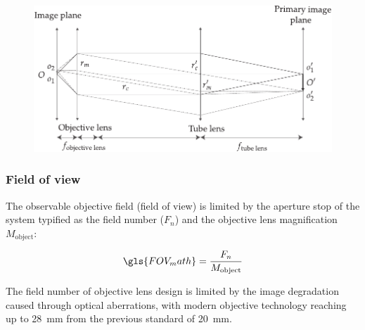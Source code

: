 \begin{figure}
    \centering
    \includegraphics{./magnification}
    \caption{}
    \label{fig:magnification}
\end{figure}






\subsubsection{Field of view}


The observable objective field (field of view) is limited by the aperture stop of the system typified as the field number ($F_n $) and the \gls{objective lens} magnification $M_{\text{object}}$:

\begin{align}
\gls{FOV_math} = \frac{F_{n}}{M_{\text{object}}}
\end{align}

The field number of \gls{objective lens} design is limited by the image degradation caused through optical aberrations, with modern objective technology reaching up to \SI{28}{\milli\meter} from the previous standard of \SI{20}{\milli\meter}.

